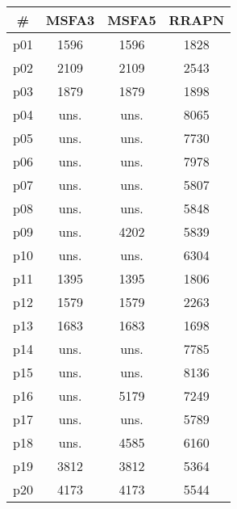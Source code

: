 \begin{tabular}{cccc}
\toprule
\textbf{\#} & \textbf{MSFA3} & \textbf{MSFA5} & \textbf{RRAPN}\\
\midrule
p01 & 1596 & 1596 & 1828\\
p02 & 2109 & 2109 & 2543\\
p03 & 1879 & 1879 & 1898\\
p04 & uns. & uns. & 8065\\
p05 & uns. & uns. & 7730\\
p06 & uns. & uns. & 7978\\
p07 & uns. & uns. & 5807\\
p08 & uns. & uns. & 5848\\
p09 & uns. & 4202 & 5839\\
p10 & uns. & uns. & 6304\\
p11 & 1395 & 1395 & 1806\\
p12 & 1579 & 1579 & 2263\\
p13 & 1683 & 1683 & 1698\\
p14 & uns. & uns. & 7785\\
p15 & uns. & uns. & 8136\\
p16 & uns. & 5179 & 7249\\
p17 & uns. & uns. & 5789\\
p18 & uns. & 4585 & 6160\\
p19 & 3812 & 3812 & 5364\\
p20 & 4173 & 4173 & 5544\\
\bottomrule
\end{tabular}

